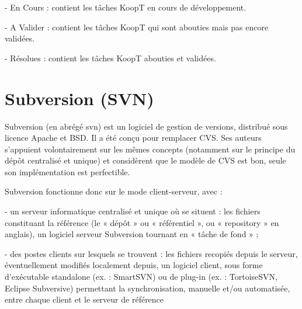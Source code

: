- En Cours :  contient les tâches KoopT en cours de développement.

- A Valider : contient les tâches KoopT qui sont abouties mais pas encore validées.

- Résolues : contient les tâches KoopT abouties et validées. 

\section{Subversion (SVN)}

Subversion (en abrégé svn) est un logiciel de gestion de versions, distribué sous licence Apache et BSD. Il a été conçu pour remplacer CVS. Ses auteurs s'appuient volontairement sur les mêmes concepts (notamment sur le principe du dépôt centralisé et unique) et considèrent que le modèle de CVS est bon, seule son implémentation est perfectible.

Subversion fonctionne donc sur le mode client-serveur, avec :

- un serveur informatique centralisé et unique où se situent :
les fichiers constituant la référence (le « dépôt » ou « référentiel », ou « repository » en anglais),
un logiciel serveur Subversion tournant en « tâche de fond » ;

- des postes clients sur lesquels se trouvent :
les fichiers recopiés depuis le serveur, éventuellement modifiés localement depuis,
un logiciel client, sous forme d'exécutable standalone (ex. : SmartSVN) ou de plug-in (ex. : TortoiseSVN, Eclipse Subversive) permettant la synchronisation, manuelle et/ou automatisée, entre chaque client et le serveur de référence
 
